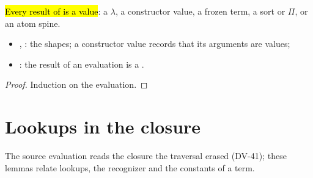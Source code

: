 \begin{lemma}
  \label{lem:EraseProof-SrcValue}
  \leanok
   \hl{Every result of  is a value}: a $\lambda$, a constructor value, a frozen term, a sort or $\Pi$, or an atom spine.
  \begin{itemize}
  \item {}, : the shapes; a constructor value records that its arguments are values;
  \item {}: the result of an evaluation is a .
  \end{itemize}
\end{lemma}
\begin{proof}
  \leanok
   Induction on the evaluation.
\end{proof}

\section{Lookups in the closure}\label{sec:source-decls}

The source evaluation reads the closure the traversal erased (DV-41); these lemmas relate lookups, the recognizer and the constants of a term.

